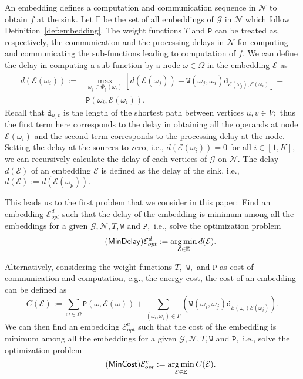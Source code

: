 \documentclass[journal]{IEEEtran}
\DeclareMathOperator*{\argmin}{arg\,min}
\newcommand{\net}{\mathcal{N}}
\newcommand{\netnodes}{V}
\newcommand{\compgraph}{\mathcal{G}}
\newcommand{\compnodes}{\Omega}
\newcommand{\compedges}{\Gamma}
\newcommand{\prenodes}[1]{\Phi_{\uparrow}(#1)}
\newcommand{\distance}{\mathtt{d}} \newcommand{\edgewt}{\mathtt{W}} \newcommand{\processingwt}{\mathtt{P}}
\newcommand{\embedding}{\mathcal{E}}
\newcommand{\setofembeddings}{\mathbb{E}}
\begin{document}
An embedding defines a computation and communication
sequence in $\net$ to obtain $f$ at the sink. Let $\setofembeddings$
be the set of all embeddings of $\compgraph$ in $\net$ which
follow Definition~\ref{def:embedding}.  The weight functions $T$ and
$\processingwt$ can be treated as, respectively, the communication and the
processing delays in $\net$ for computing and communicating the
sub-functions leading to computation of $f.$ We can define the delay in
computing a sub-function by a node $\omega \in \compnodes$ in the
embedding $\embedding$ as
\begin{equation}
   \begin{split}
    d(\embedding(\omega_i)) := & \max_{\omega_j \in \prenodes
      {\omega_i}} [d(\embedding(\omega_j)) +
      \edgewt(\omega_j,\omega_i)\distance_{\embedding(\omega_j),
        \embedding(\omega_i)}] + \\ &
    \processingwt(\omega_i,\embedding(\omega_i)). \label{eq:nodedelay}
  \end{split} 
\end{equation} 
Recall that $\distance_{u,v}$ is the length of the shortest path between
vertices $u,v \in \netnodes;$ thus the first term here corresponds to
the delay in obtaining all the operands at node $\embedding(\omega_i)$
and the second term corresponds to the processing delay at the
node. Setting the delay at the sources to zero, i.e.,
$d(\embedding(\omega_i)) = 0$ for all $i \in [1,K],$ we can
recursively calculate the delay of each vertices of $\compgraph$ on
$\net.$ The delay $d(\embedding)$ of an embedding $\embedding$ is defined
 as the delay of the sink, i.e., $d(\embedding) := d(\embedding(\omega_p)).$

This leads us to the first problem that we consider in this
paper:~Find an embedding $\embedding_{opt}^d$ such that the delay of
the embedding is minimum among all the embeddings for a given
$\compgraph, \net, T,\edgewt$ and $\processingwt,$ i.e., solve the
optimization problem
\begin{equation}
  \label{mindelay}
  \tag{\textsf{MinDelay}}
  \embedding_{opt}^d := \argmin_{\embedding \in \setofembeddings}
  d(\embedding).
\end{equation}


Alternatively, considering the weight functions $T,$ $\edgewt,$ and
$\processingwt$ as cost of communication and computation, e.g., the
energy cost, the cost of an embedding can be defined as
\begin{equation}
  C(\embedding) := \sum_{\omega \in \compnodes}
  \processingwt(\omega,\embedding(\omega)) + \sum_{(\omega_i,\omega_j) \in
    \compedges} \left(\edgewt(\omega_i,\omega_j)
  \distance_{\embedding(\omega_i)\embedding(\omega_j)}\right).
  \label{eq:embedding-cost}
\end{equation}
We can then find an embedding $\embedding_{opt}^c$ such that the cost
of the embedding is minimum among all the embeddings for a given
$\compgraph, \net, T,\edgewt$ and $\processingwt,$ i.e., solve the
optimization problem
\begin{equation}
  \label{mincost}
  \tag{\textsf{MinCost}}
  \embedding_{opt}^c := \argmin_{\embedding \in \setofembeddings} C(\embedding).
\end{equation}
\end{document}

